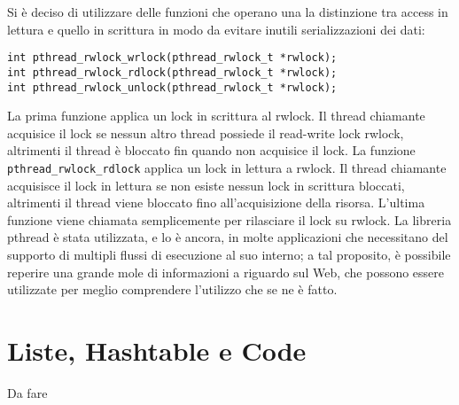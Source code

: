 Si è deciso di utilizzare delle funzioni che operano una la distinzione tra access in lettura e quello in scrittura in modo da evitare inutili serializzazioni dei dati:
\begin{center}
\begin{lstlisting}
int pthread_rwlock_wrlock(pthread_rwlock_t *rwlock);
int pthread_rwlock_rdlock(pthread_rwlock_t *rwlock);
int pthread_rwlock_unlock(pthread_rwlock_t *rwlock);
\end{lstlisting}
\end{center}
La prima funzione applica un lock in scrittura al rwlock. Il thread chiamante acquisice il lock se nessun altro thread possiede il read-write lock rwlock, altrimenti il thread è bloccato fin quando non acquisice il lock. La funzione \texttt{pthread\_rwlock\_rdlock} applica un lock in lettura a rwlock. Il thread chiamante acquisisce il lock in lettura se non esiste nessun lock in scrittura bloccati, altrimenti il thread viene bloccato fino all’acquisizione della risorsa. L’ultima funzione viene chiamata semplicemente per rilasciare il lock su rwlock.
La libreria pthread è stata utilizzata, e lo è ancora, in molte applicazioni che necessitano del supporto di multipli flussi di esecuzione al suo interno; a tal proposito, è possibile reperire una grande mole di informazioni a riguardo sul Web, che possono essere utilizzate per meglio comprendere l’utilizzo che se ne è fatto.
\section{Liste, Hashtable e Code}
Da fare